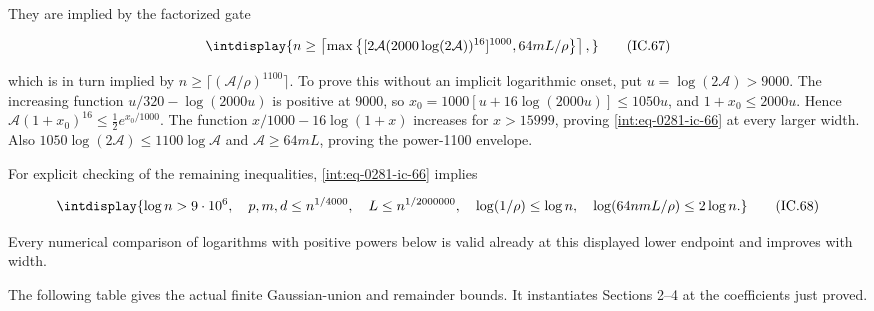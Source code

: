 
They are implied by the factorized gate


\begingroup\renewcommand{\theHequation}{intdisplay.661}
\begin{equation}
\intdisplay{
n\ge\left\lceil\max\left\{
 [2\mathcal A(2000\log(2\mathcal A))^{16}]^{1000},
 64mL/\rho\right\}\right\rceil,
}
\tag{IC.67}
\label{int:eq-0282-ic-67}
\end{equation}
\endgroup


which is in turn implied by \(n\ge\lceil(\mathcal A/\rho)^{1100}\rceil\). To prove this without an implicit logarithmic onset, put \(u=\log(2\mathcal A)>9000\). The increasing function \(u/320-\log(2000u)\) is positive at 9000, so \(x_0=1000[u+16\log(2000u)]\le1050u\), and \(1+x_0\le2000u\). Hence \(\mathcal A(1+x_0)^{16}\le\tfrac12 e^{x_0/1000}\). The function \(x/1000-16\log(1+x)\) increases for \(x>15999\), proving \eqref{int:eq-0281-ic-66} at every larger width. Also \(1050\log(2\mathcal A)\le1100\log\mathcal A\) and \(\mathcal A\ge64mL\), proving the power-1100 envelope.



For explicit checking of the remaining inequalities, \eqref{int:eq-0281-ic-66} implies


\begingroup\renewcommand{\theHequation}{intdisplay.662}
\begin{equation}
\intdisplay{
\log n>9\cdot10^6,\quad
 p,m,d\le n^{1/4000},\quad L\le n^{1/2000000},\quad
 \log(1/\rho)\le\log n,\quad
 \log(64nmL/\rho)\le2\log n.
}
\tag{IC.68}
\label{int:eq-0283-ic-68}
\end{equation}
\endgroup


Every numerical comparison of logarithms with positive powers below is valid already at this displayed lower endpoint and improves with width.



The following table gives the actual finite Gaussian-union and remainder bounds. It instantiates Sections 2--4 at the coefficients just proved.


